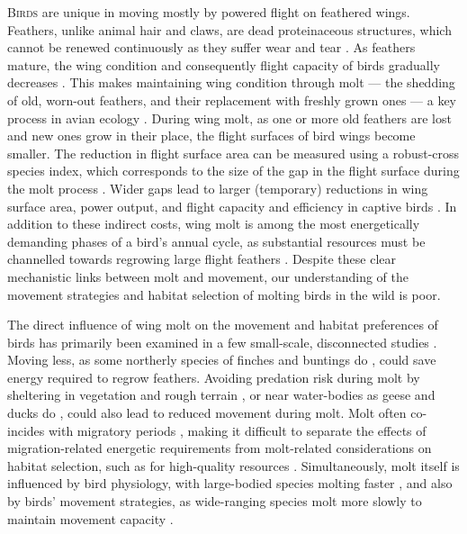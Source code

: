 
\begin{refsection}

\newrefcontext[sorting=ynt]

\lettrine{B}{irds} are unique in moving mostly by powered flight on feathered wings.
Feathers, unlike animal hair and claws, are dead proteinaceous structures, which cannot be renewed continuously as they suffer wear and tear \cite{rayner1988,jenni1989}.
As feathers mature, the wing condition and consequently flight capacity of birds gradually decreases \cite{lindstrom1994,hedenstrom1999,hedenstrom2003}.
This makes maintaining wing condition through molt --- the shedding of old, worn-out feathers, and their replacement with freshly grown ones --- a key process in avian ecology \cite{ginn1983,rayner1988}.
During wing molt, as one or more old feathers are lost and new ones grow in their place, the flight surfaces of bird wings become smaller.
The reduction in flight surface area can be measured using a robust-cross species index, which corresponds to the size of the gap in the flight surface during the molt process \citep{lind2001,kiat2016}.
Wider gaps lead to larger (temporary) reductions in wing surface area, power output, and flight capacity and efficiency in captive birds \cite{tucker1991,swaddle1996,swaddle1997,williams2003,lind2001,lind2001a,bowlin2009}.
In addition to these indirect costs, wing molt is among the most energetically demanding phases of a bird's annual cycle, as substantial resources must be channelled towards regrowing large flight feathers \cite{lindstrom1993,newton2009,kiat2017}.
Despite these clear mechanistic links between molt and movement, our understanding of the movement strategies and habitat selection of molting birds in the wild is poor.

The direct influence of wing molt on the movement and habitat preferences of birds has primarily been examined in a few small-scale, disconnected studies \citep{bell1970,haukioja1971,green1975,francis1991,madsen1987a,fox1998}.
Moving less, as some northerly species of finches and buntings do \citep{bell1970,haukioja1971,green1975,francis1991}, could save energy required to regrow feathers.
Avoiding predation risk during molt by sheltering in vegetation and rough terrain \citep{bell1970,haukioja1971,green1975,francis1991}, or near water-bodies as geese and ducks do \cite{madsen1987a,fox1998}, could also lead to reduced movement during molt.
Molt often co-incides with migratory periods \citep{kiat2019}, making it difficult to separate the effects of migration-related energetic requirements \cite{alerstam1990,wikelski2003,horvitz2014} from molt-related considerations on habitat selection, such as for high-quality resources \cite{madsen1987a,fox1998}.
Simultaneously, molt itself is influenced by bird physiology, with large-bodied species molting faster \citep{kiat2021,jenni2020}, and also by birds' movement strategies, as wide-ranging species molt more slowly to maintain movement capacity \cite{kiat2016}.


\end{refsection}
